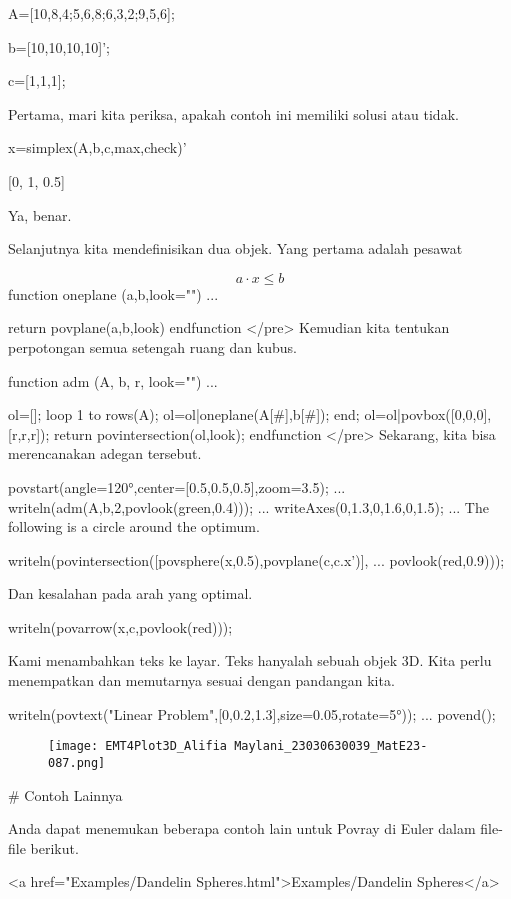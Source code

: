 \documentclass{article}
\begin{document}
\>A=[10,8,4;5,6,8;6,3,2;9,5,6];

\>b=[10,10,10,10]';

\>c=[1,1,1];


Pertama, mari kita periksa, apakah contoh ini memiliki solusi atau
tidak.


\>x=simplex(A,b,c,\>max,\>check)'


    [0,  1,  0.5]

Ya, benar.


Selanjutnya kita mendefinisikan dua objek. Yang pertama adalah pesawat


$$a \cdot x \le b$$\>function oneplane (a,b,look="") ...


      return povplane(a,b,look)
    endfunction
</pre>
Kemudian kita tentukan perpotongan semua setengah ruang dan kubus.


\>function adm (A, b, r, look="") ...


      ol=[];
      loop 1 to rows(A); ol=ol|oneplane(A[#],b[#]); end;
      ol=ol|povbox([0,0,0],[r,r,r]);
      return povintersection(ol,look);
    endfunction
</pre>
Sekarang, kita bisa merencanakan adegan tersebut.


\>povstart(angle=120°,center=[0.5,0.5,0.5],zoom=3.5); ...  
\>   writeln(adm(A,b,2,povlook(green,0.4))); ...  
\>   writeAxes(0,1.3,0,1.6,0,1.5); ...  
\>  
The following is a circle around the optimum.


\>writeln(povintersection([povsphere(x,0.5),povplane(c,c.x')], ...  
\>     povlook(red,0.9)));


Dan kesalahan pada arah yang optimal.


\>writeln(povarrow(x,c,povlook(red)));


Kami menambahkan teks ke layar. Teks hanyalah sebuah objek 3D. Kita
perlu menempatkan dan memutarnya sesuai dengan pandangan kita.


\>writeln(povtext("Linear Problem",[0,0.2,1.3],size=0.05,rotate=5°)); ...  
\>   povend();


\begin{figure}
    \centering
    \texttt{[image: EMT4Plot3D\_Alifia Maylani\_23030630039\_MatE23-087.png]}
    \caption{}
    \label{fig:enter-label}
\end{figure}

# Contoh Lainnya

Anda dapat menemukan beberapa contoh lain untuk Povray di Euler dalam
file-file berikut.


  <a href="Examples/Dandelin Spheres.html">Examples/Dandelin Spheres</a>  
\end{document}
